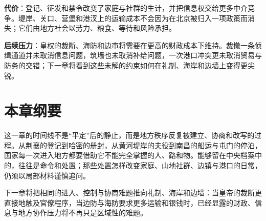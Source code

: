 \textbf{代价}：登记、征发和禁令改变了家庭与社群的生计，并把信息权交给更多中介竞争。堤岸、关口、营堡和港汊上的运输成本不会因为在北京被归入一项政策而消失；它们由地方社会以劳力、粮食、等待和风险承担。

\textbf{后续压力}：皇权的裁断、海防和边市将需要在更高的财政成本下维持。裁撤一条侦缉通道并未取消信息问题，筑墙也未取消补给问题，一次港口冲突更未取消贸易与防务的交错；下一章将看到这些未解的约束如何在礼制、海岸和边墙上变得更尖锐。

\section{本章纲要}

这一章的时间线不是“平定”后的静止，而是地方秩序反复被建立、协商和改写的过程。从荆襄的登记到哈密的册封，从黄河堤岸的夫役到南昌的船运与屯门的停泊，国家每一次进入地方都要借助它不能完全掌握的人、路和物。能够留在中央档案中的，往往是命令和处置；那些处置怎样改变家庭、山地社群、边镇与港口的日常，仍须以局部材料谨慎追问。

下一章将把相同的进入、控制与协商难题推向礼制、海岸和边墙：当皇帝的裁断更直接地触及官僚程序，当边防与海防要求更多运输和银钱时，已经显露的财政、信息与地方协作压力将不再只是区域性的难题。
